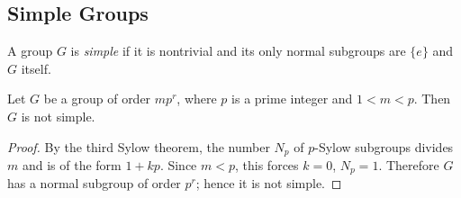 \subsection{Simple Groups}\label{simplegroups}
A group $G$ is \emph{simple} if it is nontrivial and its only normal subgroups are $\{ e \}$ and $G$ itself.

\begin{proposition}
Let $G$ be a group of order $mp^r$, where $p$ is a prime integer and $1 < m < p$. Then $G$ is not simple.
\end{proposition}

\begin{proof}
By the third Sylow theorem, the number $N_p$ of $p$-Sylow subgroups divides $m$ and is of the form $1 + kp$. Since $m < p$, this forces
$k = 0$, $N_p = 1$. Therefore $G$ has a normal subgroup of order $p^r$; hence it is not simple.
\end{proof}